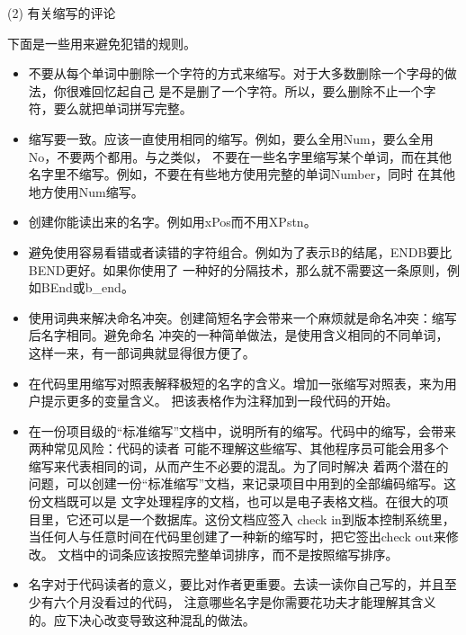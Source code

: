 \documentclass{article}
\begin{document}
\par
(2) 有关缩写的评论
\par
下面是一些用来避免犯错的规则。
\begin{itemize}
    \item 不要从每个单词中删除一个字符的方式来缩写。对于大多数删除一个字母的做法，你很难回忆起自己
    是不是删了一个字符。所以，要么删除不止一个字符，要么就把单词拼写完整。
    \item 缩写要一致。应该一直使用相同的缩写。例如，要么全用Num，要么全用No，不要两个都用。与之类似，
    不要在一些名字里缩写某个单词，而在其他名字里不缩写。例如，不要在有些地方使用完整的单词Number，同时
    在其他地方使用Num缩写。
    \item 创建你能读出来的名字。例如用xPos而不用XPstn。
    \item 避免使用容易看错或者读错的字符组合。例如为了表示B的结尾，ENDB要比BEND更好。如果你使用了
    一种好的分隔技术，那么就不需要这一条原则，例如BEnd或b\_end。
    \item 使用词典来解决命名冲突。创建简短名字会带来一个麻烦就是命名冲突：缩写后名字相同。避免命名
    冲突的一种简单做法，是使用含义相同的不同单词，这样一来，有一部词典就显得很方便了。
    \item 在代码里用缩写对照表解释极短的名字的含义。增加一张缩写对照表，来为用户提示更多的变量含义。
    把该表格作为注释加到一段代码的开始。
    \item 在一份项目级的“标准缩写”文档中，说明所有的缩写。代码中的缩写，会带来两种常见风险：代码的读者
    可能不理解这些缩写、其他程序员可能会用多个缩写来代表相同的词，从而产生不必要的混乱。为了同时解决
    着两个潜在的问题，可以创建一份“标准缩写”文档，来记录项目中用到的全部编码缩写。这份文档既可以是
    文字处理程序的文档，也可以是电子表格文档。在很大的项目里，它还可以是一个数据库。这份文档应签入
    check in到版本控制系统里，当任何人与任意时间在代码里创建了一种新的缩写时，把它签出check out来修改。
    文档中的词条应该按照完整单词排序，而不是按照缩写排序。
    \item 名字对于代码读者的意义，要比对作者更重要。去读一读你自己写的，并且至少有六个月没看过的代码，
    注意哪些名字是你需要花功夫才能理解其含义的。应下决心改变导致这种混乱的做法。
\end{itemize}
\end{document}
